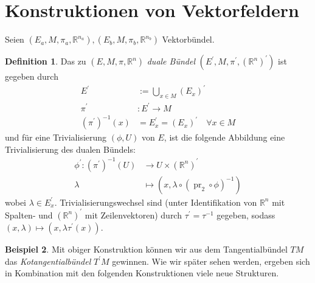 \documentclass[a4paper]{scrreprt}
\numberwithin{equation}{chapter}
\DeclareMathOperator{\pr}{pr}
\newcommand{\R}{\mathbb{R}}
\theoremstyle{definition}
\newtheorem{defn}{Definition}[section]
\newtheorem{bsp}[defn]{Beispiel}
\begin{document}
	\section{Konstruktionen von Vektorfeldern}
		Seien $(E_a,M,\pi_a,\R^{n_a}),(E_b,M,\pi_b,\R^{n_b})$ Vektorbündel.\\
		\begin{defn}
			Das zu $(E,M,\pi,\R^{n})$ \emph{duale Bündel} $(E^{\prime},M,\pi^{\prime},(\R^n)^{\prime})$ ist gegeben durch
			\begin{align*}
				E^{\prime}&:=\bigcup_{x\in M}(E_{x})^{\prime}\\
				\pi^{\prime}&\colon E^{\prime}\rightarrow M\\
				(\pi^{\prime})^{-1}(x)&=E^{\prime}_x=(E_{x})^{\prime}\quad \forall x\in M
			\end{align*}
			und für eine Trivialisierung $(\phi,U)$ von $E$, ist die folgende Abbildung eine Trivialisierung des dualen Bündels:
			\begin{align*}
				\phi^{\prime}\colon(\pi^{\prime})^{-1}(U)&\rightarrow U\times (\R^n)^{\prime}\\
				\lambda&\mapsto\left(x,\lambda\circ(\pr_2\circ\phi)^{-1}\right)
			\end{align*}
			wobei $\lambda\in E_x^{\prime}$. Trivialisierungswechsel sind (unter Identifikation von $\R^n$ mit Spalten- und $(\R^n)^{\prime}$ mit Zeilenvektoren) durch $\tau^{\prime}=\tau^{-1}$ gegeben, sodass $(x,\lambda)\mapsto(x,\lambda\tau^{\prime}(x))$.
		\end{defn}
		\begin{bsp}
			Mit obiger Konstruktion können wir aus dem Tangentialbündel $TM$ das \emph{Kotangentialbündel} $T^{\prime}M$ gewinnen. Wie wir später sehen werden, ergeben sich in Kombination mit den folgenden Konstruktionen viele neue Strukturen.
		\end{bsp}
\end{document}
